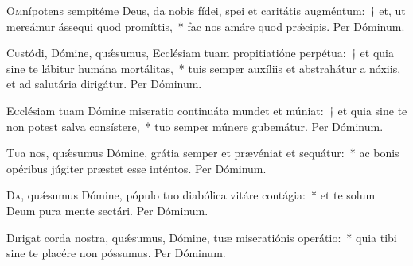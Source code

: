 \documentclass[vesperale_romanum.tex]{subfiles}
\begin{document}


\oratio

\lettrine{O}{m}nípotens sempitéme Deus, da nobis fídei, spei et caritátis augméntum:~† et, ut mereámur ássequi quod promíttis,~* fac nos amáre quod prǽcipis. Per Dóminum.



\oratio

\lettrine{C}{u}stódi, Dómine, quǽsumus, Ecclésiam tuam propitiatióne perpétua:~† et quia sine te lábitur humána mortálitas,~* tuis semper auxíliis et abstrahátur a nóxiis, et ad salutária dirigátur. Per Dóminum. 



\oratio

\lettrine{E}{c}clésiam tuam Dómine miseratio continuáta mundet et múniat:~† et quia sine te non potest salva consístere,~* tuo semper múnere gubemátur. Per Dóminum.



\oratio

\lettrine{T}{u}a nos, quǽsumus Dómine, grátia semper et prævéniat et sequátur:~* ac bonis opéribus júgiter præstet esse inténtos.
Per Dóminum.


\oratio

\lettrine{D}{a}, quǽsumus Dómine, pópulo tuo diabólica vitáre contágia:~* et te solum Deum pura mente sectári. Per Dóminum.



\oratio

\lettrine{D}{i}rigat corda nostra, quǽsumus, Dómine, tuæ miseratiónis operátio:~* quia tibi sine te placére non póssumus. Per Dóminum.

\end{document}
